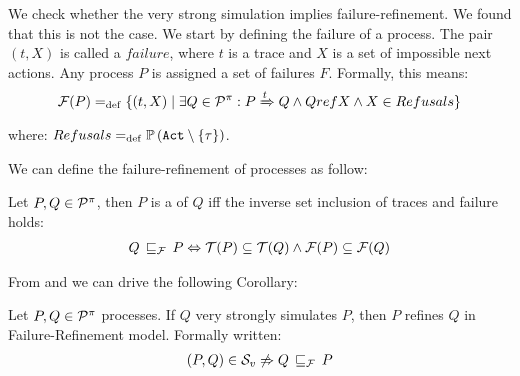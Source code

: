 We check whether the very strong simulation implies failure-refinement. We found that this is not the case. We start by defining the failure of a process.
The pair $(t, X)$ is called a $failure$, where $t$ is a trace and $X$ is a set of impossible next actions. Any process
$P$ is assigned a set of failures $F$. Formally, this means:
\begin{align}
    \Failures[P] \define \{(t,X) \mid \exists Q\in\procs: P \bigstep{t} Q \wedge Q ref X \wedge X\in Refusals\}
\label{failure}
\end{align}
where: $Refusals \define \pom{\actions\setminus\set{\tau}}$.

We can define the failure-refinement of \picalc{} processes as follow:

\begin{definition}
\label{def_failure_ref}
	Let $P,Q\in\mathcal P^{\pi}$, then $P$ is a  of $Q$ iff the inverse set inclusion of traces and failure holds:
\begin{align}
   Q \refiF P \Leftrightarrow  \Traces[P]\subseteq\Traces[Q] \wedge \Failures[P]\subseteq\Failures[Q]
\end{align}
\end{definition}

From  and  we can drive the following Corollary: 

\begin{cor}
\label{cor_sim_failure_refinement}
Let $P,Q\in\mathcal P^{\pi}$ processes. If $Q$ very strongly simulates $P$, then $P$ refines $Q$ in Failure-Refinement model. Formally written:
\begin{align}
    (P,Q)\in{}\simuv  \not\Rightarrow Q \refiF P
   \label{failure_model}
\end{align}
\end{cor}%

